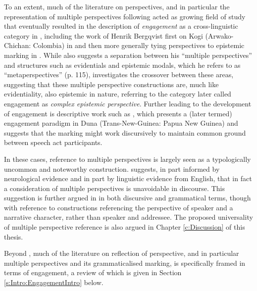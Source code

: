 To an extent, much of the literature on perspectives, and in particular the representation of multiple perspectives following  acted as growing field of study that eventually resulted in the description of \textit{engagement} as a cross-linguistic category in , including the work of Henrik Bergqvist first on Kogi (Arwako-Chichan: Colombia) in  and then more generally tying perspectives to epistemic marking in . While  also suggests a separation between his ``multiple perspectives'' and structures such as evidentials and epistemic modals, which he refers to as ``metaperspectives'' (p. 115),  investigates the crossover between these areas, suggesting that these multiple perspective constructions are, much like evidentiality, also epistemic in nature, referring to the category later called engagement as \textit{complex epistemic perspective}. Further leading to the development of engagement is descriptive work such as , which presents a (later termed) engagement paradigm in Duna (Trans-New-Guinea: Papua New Guinea) and suggests that the marking might work discursively to maintain common ground between speech act participants.

In these cases, reference to multiple perspectives is largely seen as a typologically uncommon and noteworthy construction.  suggests, in part informed by neurological evidence and in part by linguistic evidence from English, that in fact a consideration of multiple perspectives is unavoidable in discourse. This suggestion is further argued in  in both discursive and grammatical terms, though with reference to constructions referencing the perspective of speaker and a narrative character, rather than speaker and addressee. The proposed universality of multiple perspective reference is also argued in Chapter \ref{c:Discussion} of this thesis. 

Beyond , much of the literature on reflection of perspective, and in particular multiple perspectives and its grammaticalised marking, is specifically framed in terms of engagement, a review of which is given in Section \ref{s:Intro:EngagementIntro} below.

